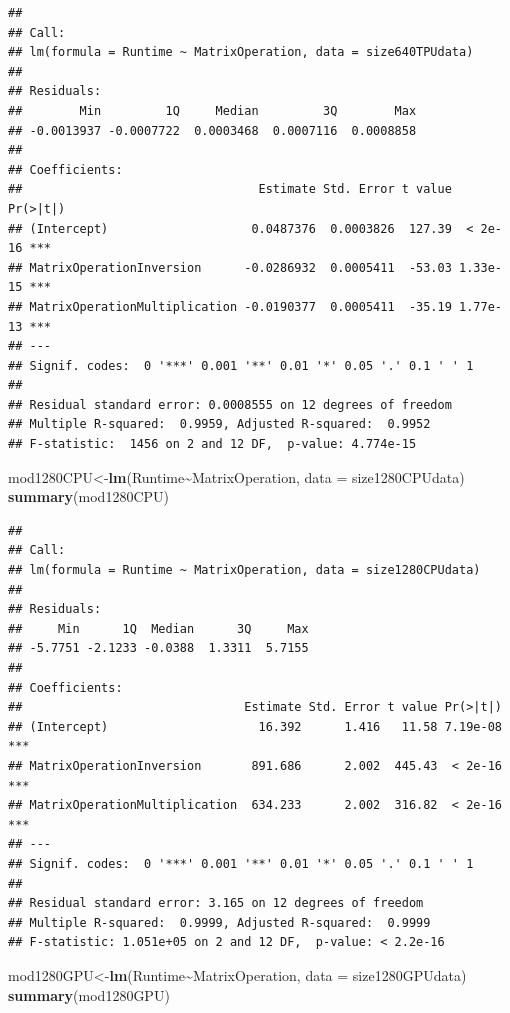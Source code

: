 \documentclass[
]{article}
\newenvironment{Shaded}{\begin{snugshade}}{\end{snugshade}}
\newcommand{\DataTypeTok}[1]{\textcolor[rgb]{0.13,0.29,0.53}{#1}}
\newcommand{\KeywordTok}[1]{\textcolor[rgb]{0.13,0.29,0.53}{\textbf{#1}}}
\newcommand{\NormalTok}[1]{#1}
\newcommand{\OperatorTok}[1]{\textcolor[rgb]{0.81,0.36,0.00}{\textbf{#1}}}
\begin{document}
\begin{verbatim}
## 
## Call:
## lm(formula = Runtime ~ MatrixOperation, data = size640TPUdata)
## 
## Residuals:
##        Min         1Q     Median         3Q        Max 
## -0.0013937 -0.0007722  0.0003468  0.0007116  0.0008858 
## 
## Coefficients:
##                                 Estimate Std. Error t value Pr(>|t|)    
## (Intercept)                    0.0487376  0.0003826  127.39  < 2e-16 ***
## MatrixOperationInversion      -0.0286932  0.0005411  -53.03 1.33e-15 ***
## MatrixOperationMultiplication -0.0190377  0.0005411  -35.19 1.77e-13 ***
## ---
## Signif. codes:  0 '***' 0.001 '**' 0.01 '*' 0.05 '.' 0.1 ' ' 1
## 
## Residual standard error: 0.0008555 on 12 degrees of freedom
## Multiple R-squared:  0.9959, Adjusted R-squared:  0.9952 
## F-statistic:  1456 on 2 and 12 DF,  p-value: 4.774e-15
\end{verbatim}

\begin{Shaded}
\begin{Highlighting}[]
\NormalTok{mod1280CPU\textless{}{-}}\KeywordTok{lm}\NormalTok{(Runtime}\OperatorTok{\textasciitilde{}}\NormalTok{MatrixOperation, }\DataTypeTok{data =}\NormalTok{ size1280CPUdata)}
\KeywordTok{summary}\NormalTok{(mod1280CPU)}
\end{Highlighting}
\end{Shaded}

\begin{verbatim}
## 
## Call:
## lm(formula = Runtime ~ MatrixOperation, data = size1280CPUdata)
## 
## Residuals:
##     Min      1Q  Median      3Q     Max 
## -5.7751 -2.1233 -0.0388  1.3311  5.7155 
## 
## Coefficients:
##                               Estimate Std. Error t value Pr(>|t|)    
## (Intercept)                     16.392      1.416   11.58 7.19e-08 ***
## MatrixOperationInversion       891.686      2.002  445.43  < 2e-16 ***
## MatrixOperationMultiplication  634.233      2.002  316.82  < 2e-16 ***
## ---
## Signif. codes:  0 '***' 0.001 '**' 0.01 '*' 0.05 '.' 0.1 ' ' 1
## 
## Residual standard error: 3.165 on 12 degrees of freedom
## Multiple R-squared:  0.9999, Adjusted R-squared:  0.9999 
## F-statistic: 1.051e+05 on 2 and 12 DF,  p-value: < 2.2e-16
\end{verbatim}

\begin{Shaded}
\begin{Highlighting}[]
\NormalTok{mod1280GPU\textless{}{-}}\KeywordTok{lm}\NormalTok{(Runtime}\OperatorTok{\textasciitilde{}}\NormalTok{MatrixOperation, }\DataTypeTok{data =}\NormalTok{ size1280GPUdata)}
\KeywordTok{summary}\NormalTok{(mod1280GPU)}
\end{Highlighting}
\end{Shaded}
\end{document}
